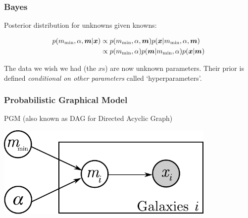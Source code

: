 \documentclass{beamer}
\begin{document}
\begin{frame}[t,plain]
\frametitle{Bayes}
Posterior distribution for unknowns given knowns:\vspace{1.5em}

\begin{align}
p(m_{\rm min}, \alpha, \boldsymbol{m} | \boldsymbol{x})
  &\propto
    p(m_{\rm min}, \alpha, \boldsymbol{m})
    p(\boldsymbol{x} | m_{\rm min}, \alpha, \boldsymbol{m})\\
  &\propto
    p(m_{\rm min}, \alpha)p(\boldsymbol{m} | m_{\rm min}, \alpha)
    p(\boldsymbol{x} | \boldsymbol{m}) 
\end{align}

The data we wish we had (the $x$s) are now unknown parameters.
Their prior is defined {\em conditional on other parameters} called
`hyperparameters'.


\end{frame}


\begin{frame}[t,plain]
\frametitle{Probabilistic Graphical Model}
PGM (also known as DAG for Directed Acyclic Graph)\vspace{1em}

\begin{center}
\includegraphics[width=0.8\textwidth]{pgm.pdf}
\end{center}

\end{frame}
\end{document}
